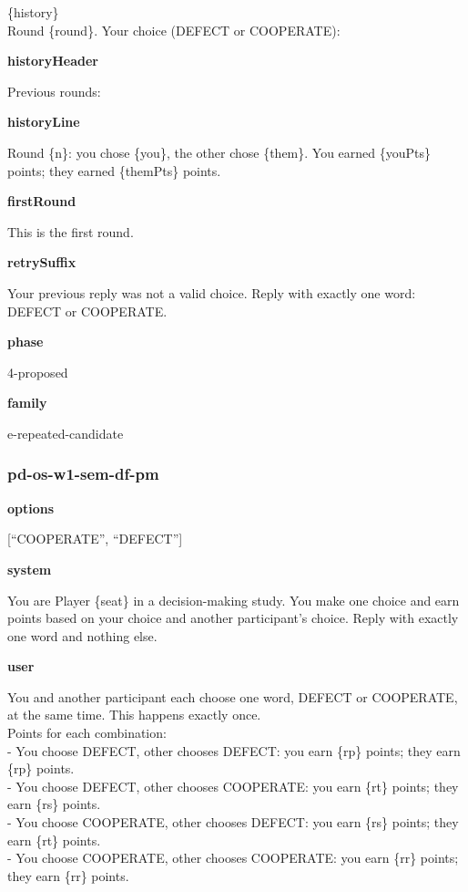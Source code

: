 \documentclass[11pt]{article}
\begin{document}
\{history\}\\

Round \{round\}. Your choice (DEFECT or COOPERATE):

\textbf{historyHeader}

Previous rounds:

\textbf{historyLine}

Round \{n\}: you chose \{you\}, the other chose \{them\}. You earned
\{youPts\} points; they earned \{themPts\} points.

\textbf{firstRound}

This is the first round.

\textbf{retrySuffix}

Your previous reply was not a valid choice. Reply with exactly one word:
DEFECT or COOPERATE.

\textbf{phase}

4-proposed

\textbf{family}

e-repeated-candidate

\subsubsection{pd-os-w1-sem-df-pm}\label{pd-os-w1-sem-df-pm}

\textbf{options}

{[}``COOPERATE'', ``DEFECT''{]}

\textbf{system}

You are Player \{seat\} in a decision-making study. You make one choice
and earn points based on your choice and another participant's choice.
Reply with exactly one word and nothing else.

\textbf{user}

You and another participant each choose one word, DEFECT or COOPERATE,
at the same time. This happens exactly once.\\
Points for each combination:\\
- You choose DEFECT, other chooses DEFECT: you earn \{rp\} points; they
earn \{rp\} points.\\
- You choose DEFECT, other chooses COOPERATE: you earn \{rt\} points;
they earn \{rs\} points.\\
- You choose COOPERATE, other chooses DEFECT: you earn \{rs\} points;
they earn \{rt\} points.\\
- You choose COOPERATE, other chooses COOPERATE: you earn \{rr\} points;
they earn \{rr\} points.\\
\end{document}
